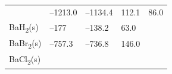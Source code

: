 \documentclass[
  9pt,
]{extbook}
\theoremstyle{definition}
\theoremstyle{definition}
\theoremstyle{definition}
\theoremstyle{remark}
\begin{document}
\begin{longtable}[]{@{}lllll@{}}
\begin{minipage}[t]{0.10\columnwidth}
\end{minipage} & \begin{minipage}[t]{0.19\columnwidth}\raggedright
--1213.0\strut
\end{minipage} & \begin{minipage}[t]{0.20\columnwidth}\raggedright
--1134.4\strut
\end{minipage} & \begin{minipage}[t]{0.18\columnwidth}\raggedright
112.1\strut
\end{minipage} & \begin{minipage}[t]{0.18\columnwidth}\raggedright
86.0\strut
\end{minipage}\tabularnewline
\begin{minipage}[t]{0.10\columnwidth}\raggedright
BaH\textsubscript{2}(s)\strut
\end{minipage} & \begin{minipage}[t]{0.19\columnwidth}\raggedright
--177\strut
\end{minipage} & \begin{minipage}[t]{0.20\columnwidth}\raggedright
--138.2\strut
\end{minipage} & \begin{minipage}[t]{0.18\columnwidth}\raggedright
63.0\strut
\end{minipage} & \begin{minipage}[t]{0.18\columnwidth}\raggedright
\strut
\end{minipage}\tabularnewline
\begin{minipage}[t]{0.10\columnwidth}\raggedright
BaBr\textsubscript{2}(s)\strut
\end{minipage} & \begin{minipage}[t]{0.19\columnwidth}\raggedright
--757.3\strut
\end{minipage} & \begin{minipage}[t]{0.20\columnwidth}\raggedright
--736.8\strut
\end{minipage} & \begin{minipage}[t]{0.18\columnwidth}\raggedright
146.0\strut
\end{minipage} & \begin{minipage}[t]{0.18\columnwidth}\raggedright
\strut
\end{minipage}\tabularnewline
\begin{minipage}[t]{0.10\columnwidth}\raggedright
BaCl\textsubscript{2}(s)\strut
\end{minipage} & \begin{minipage}[t]{0.19\columnwidth}\raggedright

\end{minipage}
\end{longtable}
\end{document}
